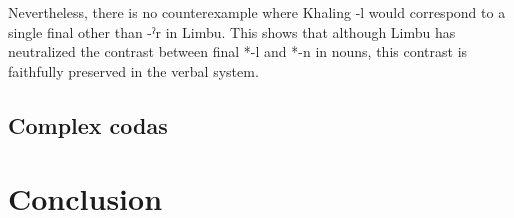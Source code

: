 \documentclass[oldfontcommands,oneside,a4paper,11pt]{article}
\newcommand{\ipa}[1]{{\phon\mbox{#1}}} %
\begin{document}
Nevertheless, there is no counterexample where Khaling \ipa{-l} would correspond to a single final other than \ipa{-ˀr} in Limbu. This shows that although Limbu has neutralized the contrast between final *\ipa{-l} and  *\ipa{-n} in nouns, this contrast is faithfully preserved in the verbal system.

\subsection{Complex codas} \label{sec:Ct}



 \section{Conclusion}






\end{document}

